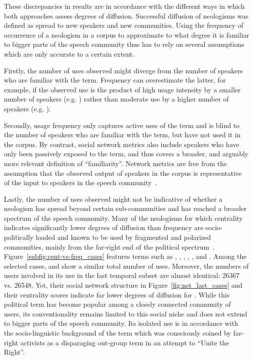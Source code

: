 \documentclass[
  a4paper,
  abstract=on,
  captions=tableabove
  ]{scrartcl}
\begin{document}

    These discrepancies in results are in accordance with the different ways in which both approaches assess degrees of diffusion. Successful diffusion of neologisms was defined as spread to new speakers and new communities. Using the frequency of occurrence of a neologism in a corpus to approximate to what degree it is familiar to bigger parts of the speech community thus has to rely on several assumptions which are only accurate to a certain extent.

    Firstly, the number of uses observed might diverge from the number of speakers who are familiar with the term. Frequency can overestimate the latter, for example, if the observed use is the product of high usage intensity by a smaller number of speakers (e.g. ) rather than moderate use by a higher number of speakers (e.g. ).

    Secondly, usage frequency only captures active uses of the term and is blind to the number of speakers who are familiar with the term, but have not used it in the corpus. By contrast, social network metrics also include speakers who have only been passively exposed to the term, and thus covers a broader, and arguably more relevant definition of \enquote{familiarity}. Network metrics are free from the assumption that the observed output of speakers in the corpus is representative of the input to speakers in the speech community~\parencite{Stefanowitsch2017CorpusbasedPerspective}.

    Lastly, the number of uses observed might not be indicative of whether a neologism has spread beyond certain sub-communities and has reached a broader spectrum of the speech community. Many of the neologisms for which centrality indicates significantly lower degrees of diffusion than frequency are socio-politically loaded and known to be used by fragmented and polarized communities, mainly from the far-right end of the political spectrum~\parencite{Sunstein2018RepublicDivided}. Figure~\ref{subfig:cent-vs-freq_cases} features terms such as , , , , , and . Among the selected cases,  and  show a similar total number of uses. Moreover, the numbers of users involved in its use in the last temporal subset are almost identical: \num{26367} vs. \num{26548}. Yet, their social network structure in Figure~\ref{fig:net_last_cases} and their centrality scores indicate far lower degrees of diffusion for . While this political term has become popular among a closely connected community of users, its conventionality remains limited to this social niche and does not extend to bigger parts of the speech community. Its isolated use is in accordance with the socio-linguistic background of the term which was consciously coined by far-right activists as a disparaging out-group term in an attempt to \enquote{Unite the Right}.
\end{document}
